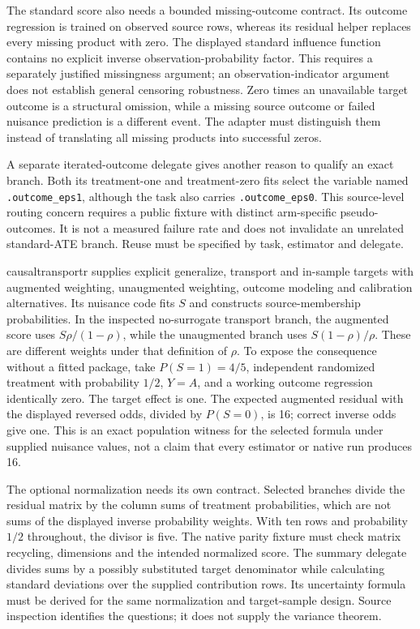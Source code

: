 The standard score also needs a bounded missing-outcome contract. Its outcome regression is trained on observed source rows, whereas its residual helper replaces every missing product with zero. The displayed standard influence function contains no explicit inverse observation-probability factor. This requires a separately justified missingness argument; an observation-indicator argument does not establish general censoring robustness. Zero times an unavailable target outcome is a structural omission, while a missing source outcome or failed nuisance prediction is a different event. The adapter must distinguish them instead of translating all missing products into successful zeros.~\citep{exec25_rtm_transportr}

A separate iterated-outcome delegate gives another reason to qualify an exact branch. Both its treatment-one and treatment-zero fits select the variable named \texttt{.outcome\_eps1}, although the task also carries \texttt{.outcome\_eps0}. This source-level routing concern requires a public fixture with distinct arm-specific pseudo-outcomes. It is not a measured failure rate and does not invalidate an unrelated standard-ATE branch. Reuse must be specified by task, estimator and delegate.~\citep{exec25_rtm_transportr}

causaltransportr supplies explicit generalize, transport and in-sample targets with augmented weighting, unaugmented weighting, outcome modeling and calibration alternatives. Its nuisance code fits $S$ and constructs source-membership probabilities. In the inspected no-surrogate transport branch, the augmented score uses $S\rho/(1-\rho)$, while the unaugmented branch uses $S(1-\rho)/\rho$. These are different weights under that definition of $\rho$. To expose the consequence without a fitted package, take $P(S=1)=4/5$, independent randomized treatment with probability $1/2$, $Y=A$, and a working outcome regression identically zero. The target effect is one. The expected augmented residual with the displayed reversed odds, divided by $P(S=0)$, is 16; correct inverse odds give one. This is an exact population witness for the selected formula under supplied nuisance values, not a claim that every estimator or native run produces 16.~\citep{exec25_rtm_causaltransportr,exec25_rtm_choice}

The optional normalization needs its own contract. Selected branches divide the residual matrix by the column sums of treatment probabilities, which are not sums of the displayed inverse probability weights. With ten rows and probability $1/2$ throughout, the divisor is five. The native parity fixture must check matrix recycling, dimensions and the intended normalized score. The summary delegate divides sums by a possibly substituted target denominator while calculating standard deviations over the supplied contribution rows. Its uncertainty formula must be derived for the same normalization and target-sample design. Source inspection identifies the questions; it does not supply the variance theorem.~\citep{exec25_rtm_causaltransportr,exec25_rtm_choice}

